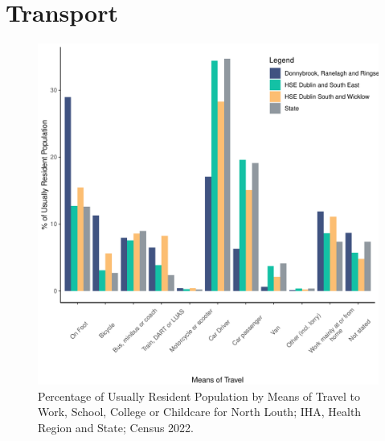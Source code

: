 \documentclass{article}
\begin{document}
\section{Transport}\label{sect:Trans}
\begin{figure}[H]
	\centering
	\includegraphics[width = 120mm]{../figures/TravelED.pdf}
	\caption{Percentage of Usually Resident Population by Means of Travel to Work, School, College or Childcare for North Louth; IHA, Health Region and State; Census 2022.}
	\label{fig:vbnv}
	\end{figure}
\end{document}
